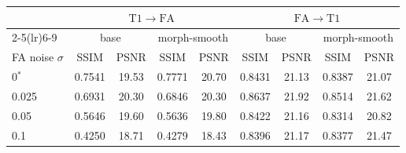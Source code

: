 \begin{tabular}{lcccccccc}
\toprule
& \multicolumn{4}{c}{$\mathrm{T1}\rightarrow\mathrm{FA}$} & \multicolumn{4}{c}{$\mathrm{FA}\rightarrow\mathrm{T1}$} \\
\cmidrule(lr){2-5}\cmidrule(lr){6-9}
& \multicolumn{2}{c}{base} & \multicolumn{2}{c}{morph-smooth} & \multicolumn{2}{c}{base} & \multicolumn{2}{c}{morph-smooth} \\
FA noise $\sigma$ & SSIM & PSNR & SSIM & PSNR & SSIM & PSNR & SSIM & PSNR \\
\midrule
0$^\ast$ & 0.7541 & 19.53 & 0.7771 & 20.70 & 0.8431 & 21.13 & 0.8387 & 21.07 \\
0.025 & 0.6931 & 20.30 & 0.6846 & 20.30 & 0.8637 & 21.92 & 0.8514 & 21.62 \\
0.05 & 0.5646 & 19.60 & 0.5636 & 19.80 & 0.8422 & 21.16 & 0.8314 & 20.82 \\
0.1 & 0.4250 & 18.71 & 0.4279 & 18.43 & 0.8396 & 21.17 & 0.8377 & 21.47 \\
\bottomrule
\end{tabular}
